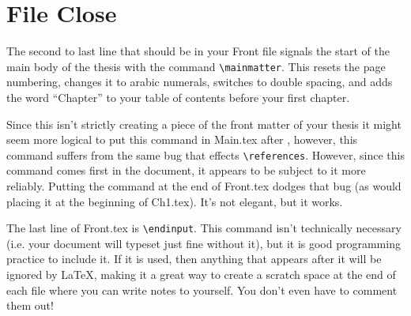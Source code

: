 \section{File Close}
The second to last line that should be in your Front file signals the start of the main body of the thesis with the command \verb=\mainmatter=.  This resets the page numbering, changes it to arabic numerals, switches to double spacing, and adds the word ``Chapter'' to your table of contents before your first chapter.

Since this isn't strictly creating a piece of the front matter of your thesis it might seem more logical to put this command in Main.tex after \verb==, however, this command suffers from the same bug that effects \verb=\references=.  However, since this command comes first in the document, it appears to be subject to it more reliably.  Putting the command at the end of Front.tex dodges that bug (as would placing it at the beginning of Ch1.tex).  It's not elegant, but it works.

The last line of Front.tex is \verb=\endinput=.  This command isn't technically necessary (i.e. your document will typeset just fine without it), but it is good programming practice to include it.  If it is used, then anything that appears after it will be ignored by \LaTeX, making it a great way to create a scratch space at the end of each file where you can write notes to yourself.  You don't even have to comment them out!
\endinput

This is a note to myself which is ignored by LaTeX due to the \endinput command above it.